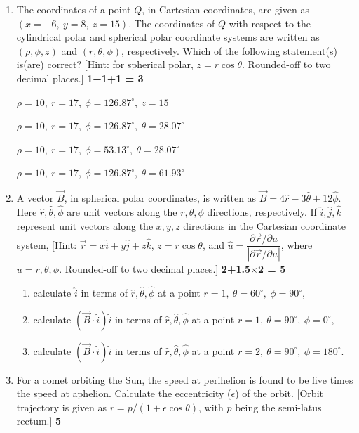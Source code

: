 \documentclass[11pt]{article}
\newcommand{\opt}[2]{%
  \begin{minipage}[t]{0.9\linewidth}
    \fbox{\textbf{#1}}\hspace{0.5em}#2
  \end{minipage}\par\vspace{2pt}
}
\begin{document}
\begin{enumerate}[leftmargin=1.6em, label=\arabic*., itemsep=14pt]
\vspace{4pt}
\noindent (ii) The magnitude of the acceleration of the sled, in $\mathrm{m/sec^2}$, is
\opt{a}{0.10}
\opt{b}{0.20}
\opt{c}{30}
\opt{d}{6.0}

\item The coordinates of a point $Q$, in Cartesian coordinates, are given as $(x = -6,\ y = 8,\ z = 15)$. The coordinates of $Q$ with respect to the cylindrical polar and spherical polar coordinate systems are written as $(\rho, \phi, z)$ and $(r, \theta, \phi)$, respectively. Which of the following statement(s) is(are) correct? [Hint: for spherical polar, $z = r\cos\theta$. Rounded-off to two decimal places.] \hfill \textbf{1+1+1 = 3}
\opt{a}{$\rho = 10,\ r = 17,\ \phi = 126.87^\circ,\ z = 15$}
\opt{b}{$\rho = 10,\ r = 17,\ \phi = 126.87^\circ,\ \theta = 28.07^\circ$}
\opt{c}{$\rho = 10,\ r = 17,\ \phi = 53.13^\circ,\ \theta = 28.07^\circ$}
\opt{d}{$\rho = 10,\ r = 17,\ \phi = 126.87^\circ,\ \theta = 61.93^\circ$}

\item A vector $\vec{B}$, in spherical polar coordinates, is written as $\vec{B} = 4\hat{r} - 3\hat{\theta} + 12\hat{\phi}$. Here $\hat{r}, \hat{\theta}, \hat{\phi}$ are unit vectors along the $r,\theta,\phi$ directions, respectively. If $\hat{i}, \hat{j}, \hat{k}$ represent unit vectors along the $x,y,z$ directions in the Cartesian coordinate system, [Hint: $\vec{r} = x\hat{i} + y\hat{j} + z\hat{k}$, $z = r\cos\theta$, and $\hat{u} = \dfrac{\partial \vec{r}/\partial u}{|\partial \vec{r}/\partial u|}$, where $u = r,\theta,\phi$. Rounded-off to two decimal places.] \hfill \textbf{2+1.5$\times$2 = 5}
\begin{enumerate}[label=(\roman*)]
  \item calculate $\hat{i}$ in terms of $\hat{r}, \hat{\theta}, \hat{\phi}$ at a point $r=1,\ \theta = 60^\circ,\ \phi = 90^\circ$,
  \item calculate $(\vec{B}\cdot\hat{i})\hat{i}$ in terms of $\hat{r}, \hat{\theta}, \hat{\phi}$ at a point $r=1,\ \theta = 90^\circ,\ \phi=0^\circ$,
  \item calculate $(\vec{B}\cdot\hat{i})\hat{i}$ in terms of $\hat{r}, \hat{\theta}, \hat{\phi}$ at a point $r=2,\ \theta = 90^\circ,\ \phi = 180^\circ$.
\end{enumerate}

\item For a comet orbiting the Sun, the speed at perihelion is found to be five times the speed at aphelion. Calculate the eccentricity ($\epsilon$) of the orbit. [Orbit trajectory is given as $r = p/(1+\epsilon\cos\theta)$, with $p$ being the semi-latus rectum.] \hfill \textbf{5}


\end{enumerate}
\end{document}
